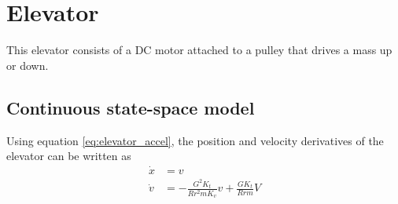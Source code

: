 \section{Elevator}
\label{sec:ss_model_elevator}

This elevator consists of a DC motor attached to a pulley that drives a mass up
or down.
\begin{bookfigure}
  
  \caption{Elevator system diagram}
\end{bookfigure}

\subsection{Continuous state-space model}

Using equation \eqref{eq:elevator_accel}, the position and velocity derivatives
of the elevator can be written as
\begin{align}
  \dot{x} &= v \\
  \dot{v} &= -\frac{G^2 K_t}{Rr^2 m K_v} v + \frac{GK_t}{Rrm} V
\end{align}

